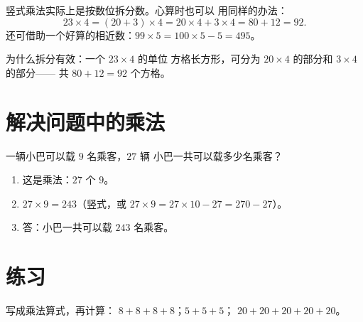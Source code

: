 \begin{example}[拆分后心算]\label{ex:g3:mult:split}
竖式乘法实际上是按数位拆分数。心算时也可以
用同样的办法：
\[
23 \times 4 = (20 + 3) \times 4 = 20 \times 4 + 3 \times 4
= 80 + 12 = 92 .
\]
还可借助一个好算的相近数：$99 \times 5 = 100 \times 5 - 5 =
495$。
\end{example}

\begin{omfigure}

{\small 为什么拆分有效：一个 $23 \times 4$ 的单位
方格长方形，可分为 $20 \times 4$ 的部分和 $3 \times 4$ 的部分——
共 $80 + 12 = 92$ 个方格。}
\end{omfigure}

\section{解决问题中的乘法}

\begin{example}\label{ex:g3:mult:problem}
一辆小巴可以载 $9$ 名乘客，$27$ 辆
小巴一共可以载多少名乘客？
\begin{enumerate}
  \item 这是乘法：$27$ 个 $9$。
  \item $27 \times 9 = 243$（竖式，或
        $27 \times 9 = 27 \times 10 - 27 = 270 - 27$）。
  \item 答：小巴一共可以载 $243$ 名乘客。
\end{enumerate}
\end{example}

\section{练习}

\begin{exercise}[$\star$]\label{exo:g3:mult:1}
写成乘法算式，再计算：
$8 + 8 + 8 + 8$；\quad $5 + 5 + 5$；\quad
$20 + 20 + 20 + 20 + 20$。
\end{exercise}

